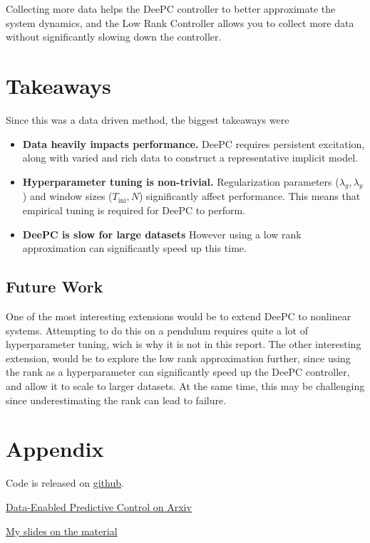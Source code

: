\documentclass[11pt,a4paper]{article}
\begin{document}
Collecting more data helps the DeePC controller to better approximate the system dynamics, and the Low Rank Controller allows you to collect more data without significantly slowing down the controller.


\section{Takeaways}
Since this was a data driven method, the biggest takeaways were 


\begin{itemize}
    \item \textbf{Data heavily impacts performance.}  
    DeePC requires persistent excitation, along with varied and rich data to construct a representative implicit model.

    \item \textbf{Hyperparameter tuning is non-trivial.}  
    Regularization parameters (\( \lambda_g, \lambda_y \)) and window sizes (\(T_{\text{ini}}, N\)) significantly affect performance. This means that empirical tuning is required for DeePC to perform.

    \item \textbf{DeePC is slow for large datasets} However using a low rank approximation can significantly speed up this time.
\end{itemize}

\subsection*{Future Work}
One of the most interesting extensions would be to extend DeePC to nonlinear systems. Attempting to do this on a pendulum requires quite a lot of hyperparameter tuning, wich is why it is not in this report.
The other interesting extension, would be to explore the low rank approximation further, since using the rank as a hyperparameter can significantly speed up the DeePC controller, and allow it to scale to larger datasets. At the same time, this may be challenging since underestimating the rank can lead to failure.
\section{Appendix}
Code is released on \href{https://github.com/Sanjit1/DeePC}{github}. 


\href{https://arxiv.org/abs/1811.05890#}{Data-Enabled Predictive Control on Arxiv}

\href{https://docs.google.com/presentation/d/1G0WMO9AojQ1DTrTkCCZOjw6U850QCCY_Jp0nHHJWcT4/edit?usp=sharing}{My slides on the material}
\end{document}
